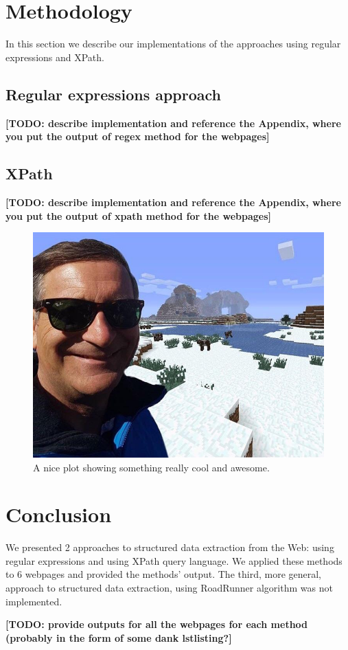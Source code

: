 \documentclass[9pt]{IEEEtran}
\begin{document}
\section{Methodology}

In this section we describe our implementations of the approaches using regular expressions and XPath.

\subsection{Regular expressions approach}
\label{section:regex}
\textbf{[TODO: describe implementation and reference the Appendix, where you put the output of regex method for the webpages]}

\subsection{XPath}
\label{section:xpath}
\textbf{[TODO: describe implementation and reference the Appendix, where you put the output of xpath method for the webpages]}

\begin{figure}[h]
    \centering
    \includegraphics[width=1\columnwidth]{plot1.jpg}
    \caption{A nice plot showing something really cool and awesome.}
    \label{fig:plot1}
\end{figure}

\section{Conclusion}

We presented 2 approaches to structured data extraction from the Web: using regular expressions and using XPath query language.
We applied these methods to 6 webpages and provided the methods' output.
The third, more general, approach to structured data extraction, using RoadRunner algorithm was not implemented.




\textbf{[TODO: provide outputs for all the webpages for each method (probably in the form of some dank lstlisting?]}
\end{document}
